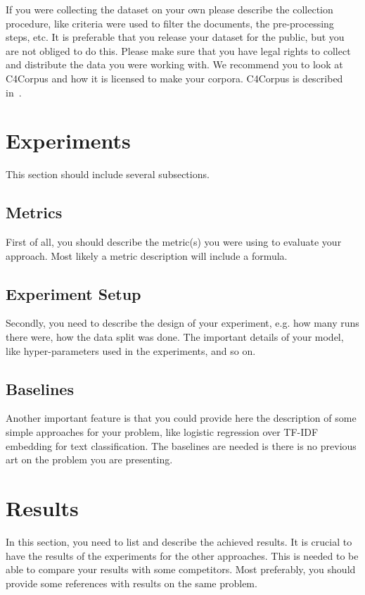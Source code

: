 \documentclass[a4paper,12pt]{article}
\begin{document}
If you were collecting the dataset on your own please describe the collection procedure, like criteria were used to filter the documents, the pre-processing steps, etc. It is preferable that you release your dataset for the public, but you are not obliged to do this. Please make sure that you have legal rights to collect and distribute the data you were working with. We recommend you to look at C4Corpus and how it is licensed to make your corpora. C4Corpus is described in~\cite{habernal2016c4corpus}.

\section{Experiments}
This section should include several subsections.
\subsection{Metrics}
First of all, you should describe the metric(s) you were using to evaluate your approach. Most likely a metric description will include a formula.

\subsection{Experiment Setup}
Secondly, you need to describe the design of your experiment, e.g. how many runs there were, how the data split was done. The important details of your model, like hyper-parameters used in the experiments, and so on.

\subsection{Baselines}
Another important feature is that you could provide here the description of some simple approaches for your problem, like logistic regression over TF-IDF embedding for text classification. The baselines are needed is there is no previous art on the problem you are presenting.

\section{Results}
In this section, you need to list and describe the achieved results. It is crucial to have the results of the experiments for the other approaches. This is needed to be able to compare your results with some competitors. Most preferably, you should provide some references with results on the same problem.
\end{document}
